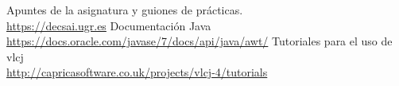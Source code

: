 
\clearpage
\begin{thebibliography}{X}
\bibitem{} Apuntes de la asignatura y guiones de prácticas.\\
\url{https://decsai.ugr.es}
\bibitem{} Documentación Java \\ \url{https://docs.oracle.com/javase/7/docs/api/java/awt/}
\bibitem{} Tutoriales para el uso de vlcj \\ \url{http://capricasoftware.co.uk/projects/vlcj-4/tutorials}
\end{thebibliography}

